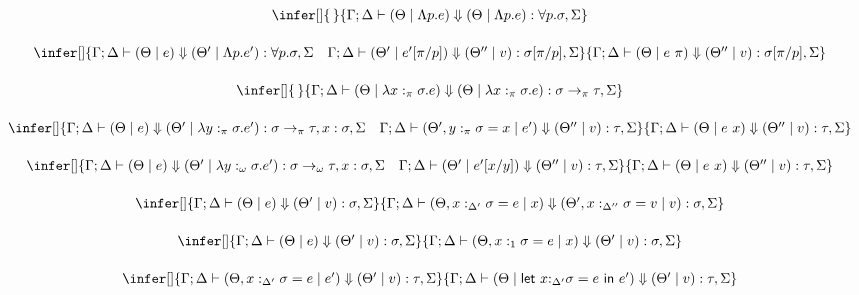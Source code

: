 \documentclass[acmsmall,review,anonymous,screen]{acmart}
\newcommand{\llet}[2]{\mathsf{let}~#1~\mathsf{in}~#2}
\begin{document}
\begin{figure}
\[
  \begin{array}{c}
    \infer[]
    {\,}
    {\Gamma;\Delta \vdash (\Theta \mid \Lambda p.e) \Downarrow (\Theta \mid
    \Lambda p.e) : \forall p . \sigma , \Sigma }
    \\[1.5em]
    \infer[]
    {\Gamma ; \Delta \vdash (\Theta \mid  e) \Downarrow (\Theta' \mid
    \Lambda p.e') : \forall p . \sigma , \Sigma \quad \Gamma ;\Delta \vdash
      (\Theta' \mid e'[\pi/p]) \Downarrow (\Theta'' \mid v) : \sigma[\pi/p], \Sigma}
    {\Gamma ; \Delta \vdash (\Theta \mid e~\pi) \Downarrow (\Theta''
      \mid v) : \sigma[\pi/p] , \Sigma  }\\[1.5em]
    \infer[]
    {\,}
    {\Gamma ;\Delta \vdash (\Theta \mid \lambda x:_\pi \sigma . e)
    \Downarrow (\Theta \mid \lambda x:_\pi\sigma .e) : \sigma
    \rightarrow_\pi \tau,\Sigma }\\[1.5em]
    \infer[]
    {\Gamma;\Delta \vdash  (\Theta \mid e) \Downarrow (\Theta' \mid
    \lambda y:_\pi \sigma . e') : \sigma \rightarrow_\pi \tau , x:\sigma, \Sigma
    \quad
    \Gamma ; \Delta \vdash (\Theta' , y:_{\pi} \sigma = x \mid e') \Downarrow (\Theta''
    \mid v) : \tau , \Sigma  }
    {\Gamma ; \Delta\vdash (\Theta \mid  e~x ) \Downarrow (\Theta''
    \mid v) : \tau , \Sigma }\\[1.5em]
           \infer[]
    {\Gamma;\Delta \vdash  (\Theta \mid e) \Downarrow (\Theta' \mid
    \lambda y:_\omega \sigma . e') : \sigma \rightarrow_\omega \tau , x:\sigma, \Sigma
    \quad
            \Gamma ; \Delta \vdash (\Theta' \mid e'[x/y]) \Downarrow (\Theta''
    \mid v) : \tau , \Sigma  }
    {\Gamma ; \Delta\vdash (\Theta \mid  e~x ) \Downarrow (\Theta''
    \mid v) : \tau , \Sigma }\\[1.5em]
     
       \infer[]
    {\Gamma ; \Delta  \vdash (\Theta \mid e)
    \Downarrow (\Theta' \mid v) : \sigma , \Sigma}
    {\Gamma ; \Delta \vdash (\Theta , x:_{\Delta'} \sigma = e \mid x)
      \Downarrow (\Theta' , x:_{\Delta''} \sigma = v \mid v) : \sigma, \Sigma}
    \\[1.5em]
           \infer[]
    {\Gamma ;\Delta  \vdash (\Theta \mid e)
    \Downarrow (\Theta' \mid v) : \sigma,\Sigma}
    {\Gamma ; \Delta \vdash (\Theta , x:_1 \sigma = e \mid x)
    \Downarrow (\Theta' \mid v) : \sigma,\Sigma}
    \\[1.5em]
    
    \infer[]
    {\Gamma ;\Delta \vdash (\Theta,x:_{\Delta'} \sigma = e \mid e')
    \Downarrow (\Theta' \mid v) : \tau,\Sigma}
    {\Gamma ; \Delta \vdash (\Theta \mid \llet{x{:}_{\Delta'}\sigma =
    e}{e'})\Downarrow (\Theta' \mid v) : \tau , \Sigma
    }\\[1.5em]
    

\end{array}\]
\end{figure}
\end{document}
